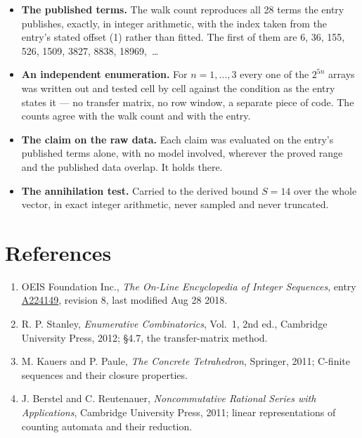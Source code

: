 \documentclass[11pt]{article}
\theoremstyle{definition}
\begin{document}
\begin{itemize}

\item {\bfseries The published terms.} The walk count reproduces all 28 terms the entry publishes, exactly, in integer arithmetic, with the index taken from the entry's stated offset (1) rather than fitted. The first of them are 6, 36, 155, 526, 1509, 3827, 8838, 18969,~\dots

\item {\bfseries An independent enumeration.} For $n = 1,\dots,3$ every one of the $2^{5n}$ arrays was written out and tested cell by cell against the condition as the entry states it --- no transfer matrix, no row window, a separate piece of code. The counts agree with the walk count and with the entry.

\item {\bfseries The claim on the raw data.} Each claim was evaluated on the entry's published terms alone, with no model involved, wherever the proved range and the published data overlap. It holds there.

\item {\bfseries The annihilation test.} Carried to the derived bound $S = 14$ over the whole vector, in exact integer arithmetic, never sampled and never truncated.

\end{itemize}

\section{References}

\begin{enumerate}

\item OEIS Foundation Inc., \emph{The On-Line Encyclopedia of Integer Sequences}, entry \href{https://oeis.org/A224149}{A224149}, revision 8, last modified Aug 28 2018.

\item R. P. Stanley, \emph{Enumerative Combinatorics}, Vol.~1, 2nd ed., Cambridge University Press, 2012; \S4.7, the transfer-matrix method.

\item M. Kauers and P. Paule, \emph{The Concrete Tetrahedron}, Springer, 2011; C-finite sequences and their closure properties.

\item J. Berstel and C. Reutenauer, \emph{Noncommutative Rational Series with Applications}, Cambridge University Press, 2011; linear representations of counting automata and their reduction.

\end{enumerate}
\end{document}
